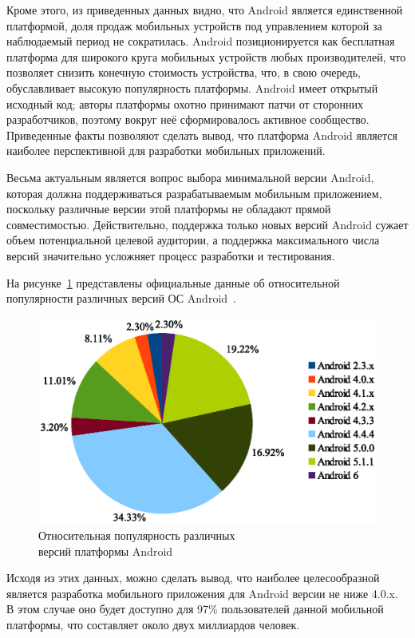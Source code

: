 Кроме этого, из приведенных данных видно, что Android является единственной
платформой, доля продаж мобильных устройств под управлением которой
за наблюдаемый период не сократилась.
Android позиционируется как бесплатная платформа для широкого круга мобильных
устройств любых производителей, что позволяет снизить конечную стоимость устройства,
что, в свою очередь, обуславливает высокую популярность платформы.
Android имеет открытый исходный код; авторы платформы
охотно принимают патчи от сторонних разработчиков,
поэтому вокруг неё сформировалось активное сообщество.
Приведенные факты позволяют сделать вывод, что платформа Android является наиболее
перспективной для разработки мобильных приложений.

Весьма актуальным является вопрос выбора минимальной версии Android,
которая должна поддерживаться разрабатываемым мобильным приложением,
поскольку различные версии этой платформы не обладают прямой совместимостью.
Действительно, поддержка только новых версий Android сужает объем потенциальной
целевой аудитории, а поддержка максимального числа версий значительно усложняет
процесс разработки и тестирования.

На рисунке~\ref{fig:stat_android} представлены официальные
данные об относительной популярности различных версий
ОС Android~\cite{google_stat_android}.

\begin{figure}[h!]
  \centering
  \includegraphics[width=150mm]{fig/stat_android.eps}
  \caption{Относительная популярность различных \\ версий платформы Android}
  \label{fig:stat_android}
\end{figure}

Исходя из этих данных, можно сделать вывод, что наиболее целесообразной
является разработка мобильного приложения для Android версии не ниже 4.0.x.
В этом случае оно будет доступно для 97\% пользователей данной мобильной платформы,
что составляет около двух миллиардов человек.


